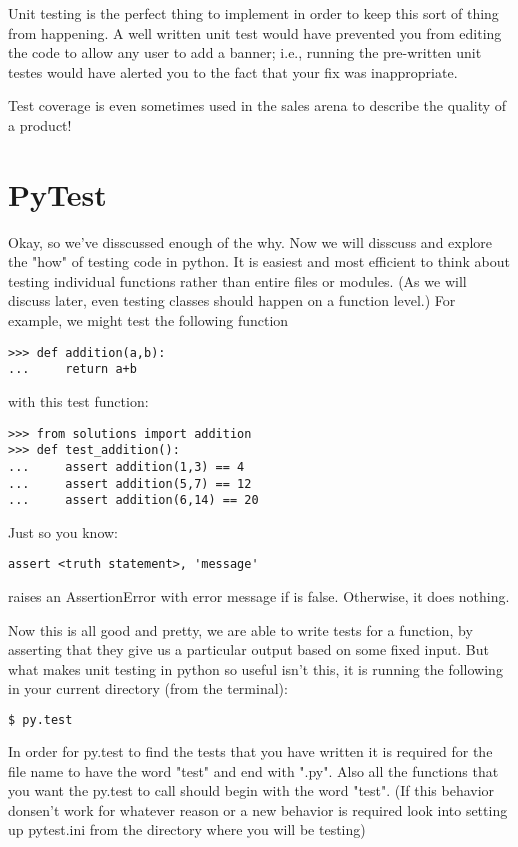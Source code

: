 Unit testing is the perfect thing to implement in order to keep this sort of thing from happening.
A well written unit test would have prevented you from editing the code to allow any user to add a banner; i.e., running the pre-written unit testes would have alerted you to the fact that your fix was inappropriate.

Test coverage is even sometimes used in the sales arena to describe the quality of a product!

\section*{PyTest}

Okay, so we've disscussed enough of the why. Now we will disscuss and explore the "how" of testing code in python.
It is easiest and most efficient to think about testing individual functions rather than entire files or modules.
(As we will discuss later, even testing classes should happen on a function level.)
For example, we might test the following function

\begin{lstlisting}
>>> def addition(a,b):
...     return a+b
\end{lstlisting}
with this test function:
\begin{lstlisting}
>>> from solutions import addition
>>> def test_addition():
...     assert addition(1,3) == 4
...     assert addition(5,7) == 12
...     assert addition(6,14) == 20
\end{lstlisting}

\begin{info}
Just so you know:
\begin{lstlisting}
assert <truth statement>, 'message'
\end{lstlisting}
raises an AssertionError with error message  if  is false.  Otherwise, it does nothing.
\end{info}

Now this is all good and pretty, we are able to write tests for a function, by asserting that they give us a particular output based on some fixed input.
But what makes unit testing in python so useful isn't this, it is running the following in your current directory (from the terminal):
\begin{lstlisting}[language=bash]
  $ py.test
\end{lstlisting}

\begin{info}
In order for py.test to find the tests that you have written it is required for the file name to have the word "test" and end with ".py".
Also all the functions that you want the py.test to call should begin with the word "test".
(If this behavior donsen't work for whatever reason or a new behavior is required look into setting up pytest.ini from the directory where you will be testing)\\
\end{info}

